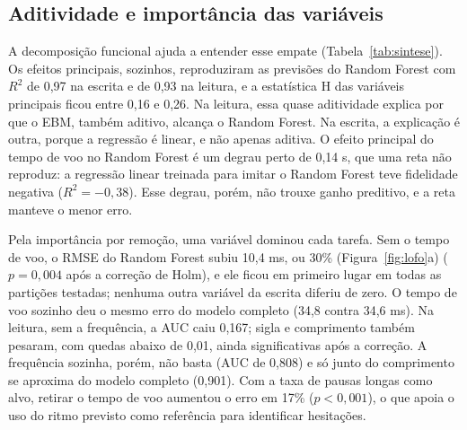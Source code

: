 \documentclass[12pt,a4paper]{article}
\newcommand{\fonte}[1]{\par\vspace{2pt}{\small Fonte: #1}}
\newcommand{\Rdois}{$R^2$}
\begin{document}
\begin{table}[!htb]
\begin{minipage}[t]{0.48\textwidth}
\centering
\caption{Escrita (KeyRecs): desempenho em validação cruzada}
\label{tab:escrita}
\small
\setlength{\tabcolsep}{3pt}

\fonte{elaborado pelos autores com a biblioteca pandas, do Python.}
\end{minipage}\hfill
\begin{minipage}[t]{0.48\textwidth}
\centering
\caption{Leitura (CompLex): desempenho em validação cruzada agrupada por palavra}
\label{tab:leitura}
\small
\setlength{\tabcolsep}{3pt}

\fonte{elaborado pelos autores com a biblioteca pandas, do Python.}
\end{minipage}
\end{table}

\subsection{Aditividade e importância das variáveis}

A decomposição funcional ajuda a entender esse empate
(Tabela~\ref{tab:sintese}). Os efeitos principais, sozinhos, reproduziram as
previsões do Random Forest com \Rdois{} de 0,97 na escrita e de 0,93 na
leitura, e a estatística H das variáveis principais ficou entre 0,16 e 0,26. Na
leitura, essa quase aditividade explica por que o EBM, também aditivo, alcança o
Random Forest. Na escrita, a explicação é outra, porque a regressão é linear, e
não apenas aditiva. O efeito principal do tempo de voo no Random Forest é um
degrau perto de 0,14 s, que uma reta não reproduz: a regressão linear treinada
para imitar o Random Forest teve fidelidade negativa ($R^2 = -0,38$). Esse
degrau, porém, não trouxe ganho preditivo, e a reta manteve o menor erro.

Pela importância por remoção, uma variável dominou cada tarefa. Sem o tempo de
voo, o RMSE do Random Forest subiu 10,4 ms, ou 30\% (Figura~\ref{fig:lofo}a) ($p = 0,004$ após a
correção de Holm), e ele ficou em primeiro lugar em todas as partições
testadas; nenhuma outra variável da escrita diferiu de zero. O tempo de voo
sozinho deu o mesmo erro do modelo completo (34,8 contra 34,6 ms). Na leitura,
sem a frequência, a AUC caiu 0,167; sigla e comprimento também pesaram, com
quedas abaixo de 0,01, ainda significativas após a correção. A frequência
sozinha, porém, não basta (AUC de 0,808) e só junto do comprimento se aproxima
do modelo completo (0,901). Com a taxa de pausas longas como alvo, retirar o
tempo de voo aumentou o erro em 17\% ($p < 0,001$), o que apoia o uso do ritmo
previsto como referência para identificar hesitações.
\end{document}
